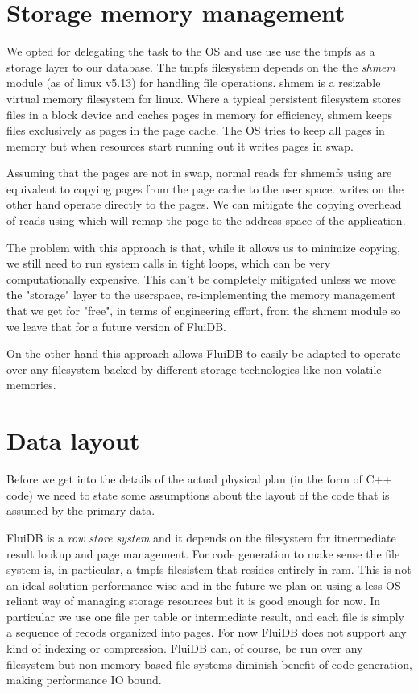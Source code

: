 \section{Storage memory management}

We opted for delegating the task to the OS and use use use the tmpfs
as a storage layer to our database. The tmpfs filesystem depends on
the the \emph{shmem} module (as of linux v5.13) for handling file
operations. shmem is a resizable virtual memory filesystem for
linux. Where a typical persistent filesystem stores files in a block
device and caches pages in memory for efficiency, shmem keeps files
exclusively as pages in the page cache. The OS tries to keep all pages
in memory but when resources start running out it writes pages in
swap.

Assuming that the pages are not in swap, normal reads for shmemfs
using  are equivalent to copying pages from the page cache to
the user space.  writes on the other hand operate directly to
the pages. We can mitigate the copying overhead of reads using 
which will remap the page to the address space of the application.

The problem with this approach is that, while it allows us to minimize
copying, we still need to run system calls in tight loops, which can
be very computationally expensive. This can't be completely mitigated
unless we move the "storage" layer to the userspace, re-implementing
the memory management that we get for "free", in terms of engineering
effort, from the shmem module so we leave that for a future version of
FluiDB.

On the other hand this approach allows FluiDB to easily be adapted to
operate over any filesystem backed by different storage technologies
like non-volatile memories.

\section{Data layout}

Before we get into the details of the actual physical plan (in the
form of C++ code) we need to state some assumptions about the layout
of the code that is assumed by the primary data.

FluiDB is a \emph{row store system} and it depends on the filesystem
for itnermediate result lookup and page management. For code
generation to make sense the file system is, in particular, a tmpfs
filesistem that resides entirely in ram. This is not an ideal solution
performance-wise and in the future we plan on using a less OS-reliant
way of managing storage resources but it is good enough for now. In
particular we use one file per table or intermediate result, and each
file is simply a sequence of recods organized into pages. For now
FluiDB does not support any kind of indexing or compression. FluiDB
can, of course, be run over any filesystem but non-memory based file
systems diminish benefit of code generation, making performance IO
bound.

